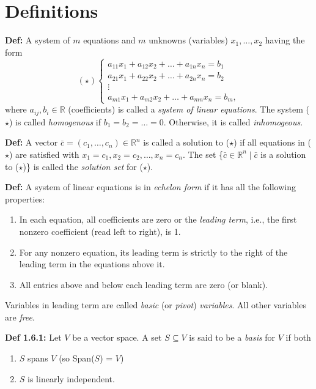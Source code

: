 \pagebreak
\section{Definitions}

\textbf{Def:} A system of $m$ equations and $m$ unknowns (variables) $x_1, \ldots , x_2$ having the form
\[
(\star)
\left\{ 
    \begin{array}{l}
        a_{11}x_1 + a_{12}x_2 + \ldots + a_{1n}x_n = b_1 \\
        a_{21}x_1 + a_{22}x_2 + \ldots + a_{2n}x_n = b_2 \\
        \vdots \\
        a_{m1}x_1 + a_{m2}x_2 + \ldots + a_{mn}x_n = b_m,
    \end{array} 
\right.
\]
where $a_{ij}, b_i \in \mathbb{R}$ (coefficients) is called a \textit{system of linear equations}. The system ($\star$) is called \textit{homogenous} if $b_1 = b_2 = \ldots = 0$. Otherwise, it is called \textit{inhomogeous}. 

\bigskip

\noindent
\textbf{Def:} A vector $\bar c = (c_1, \ldots , c_n) \in \mathbb{R}^n$ is called a solution to ($\star$) if all equations in ($\star$) are satisfied with $x_1 = c_1, x_2 = c_2, \ldots , x_n = c_n$. The set \{$\bar c \in \mathbb{R}^n \mid \bar c$ is a solution to ($\star$)\} is called the \textit{solution set} for ($\star$).

\bigskip

\noindent
\textbf{Def:} A system of linear equations is in \textit{echelon form} if it has all the following properties:
\begin{enumerate}
    \item In each equation, all coefficients are zero or the \textit{leading term}, i.e., the first nonzero coefficient (read left to right), is 1. 
    \item For any nonzero equation, its leading term is strictly to the right of the leading term in the equations above it.
    \item All entries above and below each leading term are zero (or blank). 
\end{enumerate}
Variables in leading term are called \textit{basic} (or \textit{pivot}) \textit{variables}. All other variables are \textit{free}.

\bigskip

\noindent
\textbf{Def 1.6.1:} Let $V$ be a vector space. A set $S \subseteq V$ is said to be a \textit{basis} for $V$ if both 
\begin{enumerate}
    \item $S$ spans $V$ (so Span($S$) = $V$)
    \item $S$ is linearly independent.
\end{enumerate}
